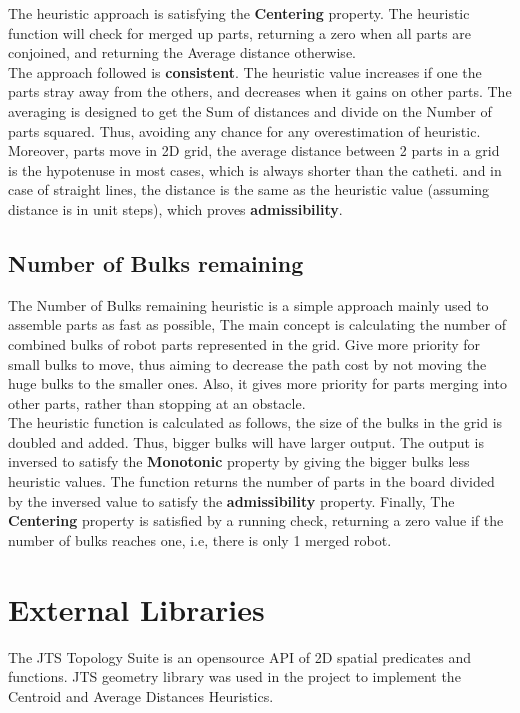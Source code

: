 The heuristic approach is satisfying the \textbf{Centering} property. The heuristic function will check for merged up parts, returning a zero when all parts are conjoined, and returning the Average distance otherwise. \\

The approach followed is \textbf{consistent}. The heuristic value increases if one the parts stray away from the others, and decreases when it gains on other parts. The averaging is designed to get the Sum of distances and divide on the Number of parts squared. Thus, avoiding any chance for any overestimation of heuristic. Moreover, parts move in 2D grid, the average distance between 2 parts in a grid is the hypotenuse in most cases, which is always shorter than the catheti. and in case of straight lines, the distance is the same as the heuristic value (assuming distance is in unit steps), which proves \textbf{admissibility}.	


\section{Number of Bulks remaining}

The Number of Bulks remaining heuristic is a simple approach mainly used to assemble parts as fast as possible, The main concept is calculating the number of combined bulks of robot parts represented in the grid. Give more priority for small bulks to move, thus aiming to decrease the path cost by not moving the huge bulks to the smaller ones. Also, it gives more priority for parts merging into other parts, rather than stopping at an obstacle.  \\

The heuristic function is calculated as follows, the size of the bulks in the grid is doubled and added. Thus, bigger bulks will have larger output. The output is inversed to satisfy the \textbf{Monotonic} property by giving the bigger bulks less heuristic values. The function returns the number of parts in the board divided by the inversed value to satisfy the \textbf{admissibility} property. Finally, The \textbf{Centering} property is satisfied by a running check, returning a zero value if the number of bulks reaches one, i.e, there is only 1 merged robot.


\chapter{External Libraries}

The JTS Topology Suite is an opensource API of 2D spatial predicates and functions. JTS geometry library was used in the project to implement the Centroid and Average Distances Heuristics. \\

